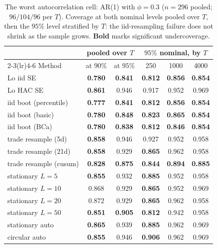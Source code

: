 \documentclass[11pt]{article}
\begin{document}
\begin{table}[t]
\centering
\caption{The worst autocorrelation cell: AR(1) with $\phi=0.3$ ($n=296$
pooled; $96/104/96$ per $T$). Coverage at both nominal levels pooled over
$T$, then the $95\%$ level stratified by $T$: the iid-resampling failure does
not shrink as the sample grows. \textbf{Bold} marks significant
undercoverage.}
\label{tab:phi03}
\small
\begin{tabular}{lcc@{\hskip 1.8em}ccc}
\toprule
& \multicolumn{2}{c}{pooled over $T$} & \multicolumn{3}{c}{$95\%$ nominal, by $T$}\\
\cmidrule(lr){2-3}\cmidrule(lr){4-6}
Method & at $90\%$ & at $95\%$ & 250 & 1000 & 4000 \\
\midrule
Lo iid SE             & \textbf{0.780} & \textbf{0.841} & \textbf{0.812} & \textbf{0.856} & \textbf{0.854} \\
Lo HAC SE             & \textbf{0.861} & 0.946 & 0.917 & 0.952 & 0.969 \\
iid boot (percentile) & \textbf{0.777} & \textbf{0.841} & \textbf{0.812} & \textbf{0.856} & \textbf{0.854} \\
iid boot (basic)      & \textbf{0.780} & \textbf{0.848} & \textbf{0.823} & \textbf{0.865} & \textbf{0.854} \\
iid boot (BCa)        & \textbf{0.780} & \textbf{0.838} & \textbf{0.812} & \textbf{0.846} & \textbf{0.854} \\
trade resample (5d)   & \textbf{0.858} & 0.946 & 0.927 & 0.952 & 0.958 \\
trade resample (21d)  & \textbf{0.858} & 0.929 & \textbf{0.865} & 0.962 & 0.958 \\
trade resample (cusum)& \textbf{0.828} & \textbf{0.875} & \textbf{0.844} & \textbf{0.894} & \textbf{0.885} \\
stationary $L{=}5$    & \textbf{0.855} & 0.932 & \textbf{0.885} & 0.952 & 0.958 \\
stationary $L{=}10$   & 0.868 & 0.929 & \textbf{0.865} & 0.952 & 0.969 \\
stationary $L{=}20$   & 0.872 & 0.929 & \textbf{0.865} & 0.962 & 0.958 \\
stationary $L{=}50$   & \textbf{0.851} & \textbf{0.905} & \textbf{0.812} & 0.942 & 0.958 \\
stationary auto       & \textbf{0.865} & 0.939 & \textbf{0.885} & 0.962 & 0.969 \\
circular auto         & \textbf{0.855} & 0.946 & \textbf{0.906} & 0.962 & 0.969 \\
\bottomrule
\end{tabular}
\end{table}
\end{document}
